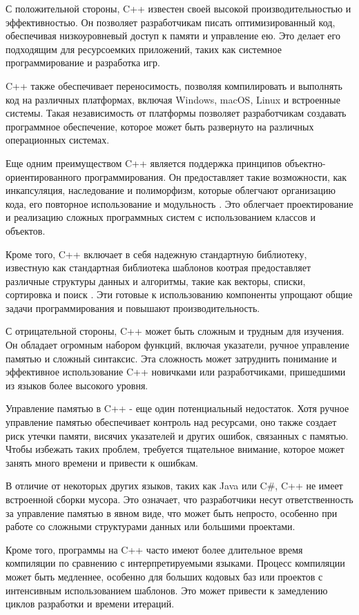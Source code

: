 С положительной стороны, C++ известен своей высокой производительностью и эффективностью. Он позволяет разработчикам писать оптимизированный код, обеспечивая низкоуровневый доступ к памяти и управление ею. Это делает его подходящим для ресурсоемких приложений, таких как системное программирование и разработка игр.

C++ также обеспечивает переносимость, позволяя компилировать и выполнять код на различных платформах, включая Windows, macOS, Linux и встроенные системы. Такая независимость от платформы позволяет разработчикам создавать программное обеспечение, которое может быть развернуто на различных операционных системах.

Еще одним преимуществом C++ является поддержка принципов объектно-ориентированного программирования. Он предоставляет такие возможности, как инкапсуляция, наследование и полиморфизм, которые облегчают организацию кода, его повторное использование и модульность \cite{4}. Это облегчает проектирование и реализацию сложных программных систем с использованием классов и объектов.

Кроме того, C++ включает в себя надежную стандартную библиотеку, известную как стандартная библиотека шаблонов коотрая предоставляет различные структуры данных и алгоритмы, такие как векторы, списки, сортировка и поиск \cite{5}. Эти готовые к использованию компоненты упрощают общие задачи программирования и повышают производительность.

С отрицательной стороны, C++ может быть сложным и трудным для изучения. Он обладает огромным набором функций, включая указатели, ручное управление памятью и сложный синтаксис. Эта сложность может затруднить понимание и эффективное использование C++ новичками или разработчиками, пришедшими из языков более высокого уровня.

Управление памятью в C++ - еще один потенциальный недостаток. Хотя ручное управление памятью обеспечивает контроль над ресурсами, оно также создает риск утечки памяти, висячих указателей и других ошибок, связанных с памятью. Чтобы избежать таких проблем, требуется тщательное внимание, которое может занять много времени и привести к ошибкам.

В отличие от некоторых других языков, таких как Java или C\#, C++ не имеет встроенной сборки мусора. Это означает, что разработчики несут ответственность за управление памятью в явном виде, что может быть непросто, особенно при работе со сложными структурами данных или большими проектами.

Кроме того, программы на C++ часто имеют более длительное время компиляции по сравнению с интерпретируемыми языками. Процесс компиляции может быть медленнее, особенно для больших кодовых баз или проектов с интенсивным использованием шаблонов. Это может привести к замедлению циклов разработки и времени итераций.

